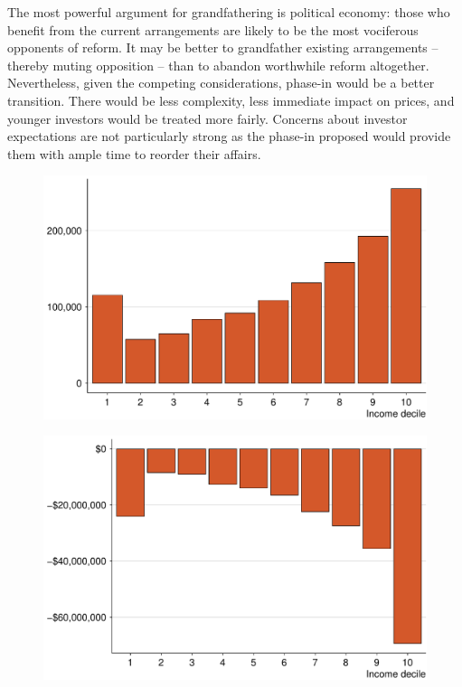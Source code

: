\documentclass{grattan}\usepackage[]{graphicx}\usepackage[]{color}
\begin{document}
The most powerful argument for grandfathering is political economy: those who benefit from the current arrangements are likely to be the most vociferous opponents of reform. It may be better to grandfather existing arrangements -- thereby muting opposition -- than to abandon worthwhile reform altogether.  
Nevertheless, given the competing considerations, phase-in would be a better transition. There would be less complexity, less immediate impact on prices, and younger investors would be treated more fairly. Concerns about investor expectations are not particularly strong as the phase-in proposed would provide them with ample time to reorder their affairs.







\begin{figure}
\includegraphics[width=\columnwidth]{figure/NegGearing_share_by_deciles-1}
\notes{}

\source{}
\end{figure}



\begin{figure}
\includegraphics[width=\columnwidth]{figure/NegGearing_amount_by_deciles-1}
\notes{}

\source{}
\end{figure}
\end{document}
